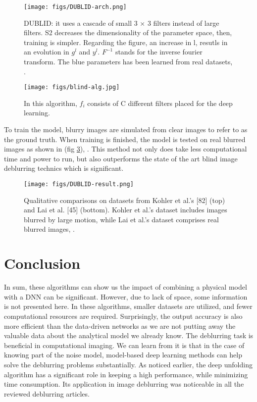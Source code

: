 \documentclass[conference, 11pt]{IEEEtran}
\begin{document}
		\begin{figure}
		\texttt{[image: figs/DUBLID-arch.png]}
		\centering
		\caption{DUBLID: it uses a cascade of small 3 × 3 filters instead of large filters. S2 decreases
			the dimensionality of the parameter space, then, training is simpler. Regarding the figure, an increase in l, resutls in an evolution in \(g^l\) and \(y^l\). \(F^{-1}\) stands for the inverse fourier transform. The blue parameters has been learned from real datasets, \cite{Li2020}.}
		\label{img:blind-result}
	\end{figure}

	\begin{figure}
		\texttt{[image: figs/blind-alg.jpg]}
		\centering
		\caption{In this algorithm, \(f_i\) consists of C different filters placed for the deep learning\cite{Li2020}.}
		\label{alg:blind}
	\end{figure}

	To train the model, blurry images are simulated from clear images to refer to as the ground truth. When training is finished, the model is tested on real blurred images as shown in (fig \ref{img:blind-result}), \cite{Li2020}. This method not only does take less computational time and power to run, but also outperforms the state of the art blind image deblurring technics which is significant.
	
	\begin{figure}[!htbp]
		\texttt{[image: figs/DUBLID-result.png]}
		\centering
		\caption{Qualitative comparisons on datasets from Kohler et al.’s [82] (top) and Lai et al. [45] (bottom). Kohler et al.’s dataset includes images blurred by large
			motion, while Lai et al.’s dataset comprises real blurred images, \cite{Li2020}.
			\label{img:blind-result}}
	\end{figure}
	
	\section{Conclusion}
	In sum, these algorithms can show us the impact of combining a physical model with a DNN can be significant. However, due to lack of space, some information is not presented here. In these algorithms, smaller datasets are utilized, and fewer computational resources are required. Surprisingly, the output accuracy is also more efficient than the data-driven networks as we are not putting away the valuable data about the analytical model we already know. The deblurring task is beneficial in computational imaging. We can learn from it is that in the case of knowing part of the noise model, model-based deep learning methods can help solve the deblurring problems substantially. As noticed earlier, the deep unfolding algorithm has a significant role in keeping a high performance, while minimizing time consumption. Its application in image deblurring was noticeable in all the reviewed deblurring articles.
	
\end{document}
